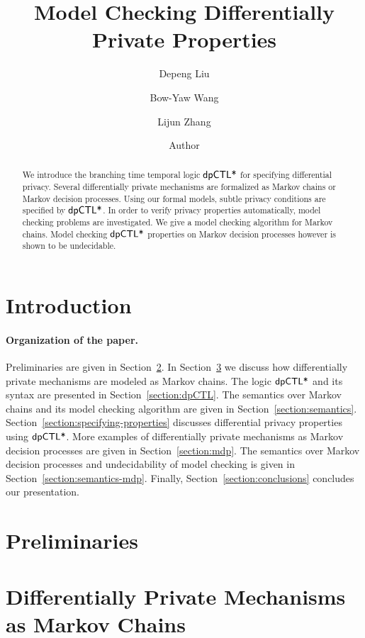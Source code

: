\documentclass{llncs}
\title{Model Checking Differentially Private Properties}
\author{
Depeng Liu\inst{1}
\and
Bow-Yaw Wang\inst{2}
\and
Lijun Zhang\inst{1}}
\institute{
Chinese Academy of Sciences
\and
Academia Sinica
}
\author{Author}
\institute{Institute}
\begin{document}
\maketitle

\begin{abstract}
  We introduce the branching time temporal logic $\textsf{dpCTL*}$ for
  specifying differential privacy. Several differentially private
  mechanisms are formalized as Markov chains or Markov decision
  processes. Using our formal models, subtle privacy conditions
  are specified by $\textsf{dpCTL*}$. In order to verify privacy properties
  automatically, model checking problems are investigated.  We
  give a model checking algorithm for Markov chains. Model checking
  $\textsf{dpCTL*}$ properties on Markov decision processes however is
  shown to be undecidable.
\end{abstract}

\section{Introduction}
\label{section:introduction}


\noindent
\paragraph{Organization of the paper.}
Preliminaries are given in Section~\ref{section:preliminaries}.
In Section~\ref{section:examples} we discuss how differentially private mechanisms are modeled as Markov chains.
The logic $\textsf{dpCTL*}$ and its syntax are presented in Section~\ref{section:dpCTL}. The semantics over Markov chains and its model checking algorithm are given in Section~\ref{section:semantics}.
Section~\ref{section:specifying-properties} discusses differential privacy properties using $\textsf{dpCTL*}$.
More examples of differentially private mechanisms as Markov decision processes are given in Section~\ref{section:mdp}.
The semantics over Markov decision processes and undecidability of model checking is given in Section~\ref{section:semantics-mdp}.
Finally,
Section~\ref{section:conclusions} concludes our presentation.

\section{Preliminaries}
\label{section:preliminaries}


\section{Differentially Private Mechanisms as Markov Chains}
\label{section:examples}

\end{document}
